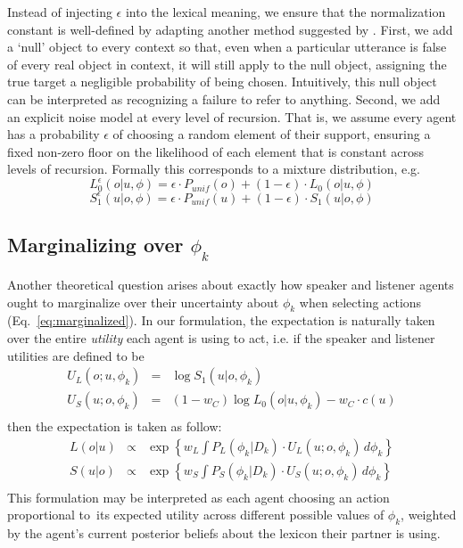 \documentclass[11pt, floatsintext]{apa6}
\begin{document}
Instead of injecting $\epsilon$ into the lexical meaning, we ensure that the normalization constant is well-defined by adapting another method suggested by .
First, we add a `null' object to every context so that, even when a particular utterance is false of every real object in context, it will still apply to the null object, assigning the true target a negligible probability of being chosen.
Intuitively, this null object can be interpreted as recognizing a failure to refer to anything.
Second, we add an explicit noise model at every level of recursion.
That is, we assume every agent has a probability $\epsilon$ of choosing a random element of their support, ensuring a fixed non-zero floor on the likelihood of each element that is constant across levels of recursion.
Formally this corresponds to a mixture distribution, e.g. 
$$L_0^{\epsilon}(o|u,\phi) = \epsilon \cdot P_{unif}(o) + (1-\epsilon) \cdot L_0(o|u,\phi)$$
$$S_1^{\epsilon}(u|o,\phi) = \epsilon \cdot P_{unif}(u) + (1-\epsilon) \cdot S_1(u|o,\phi)$$

\subsection{Marginalizing over $\phi_k$}
Another theoretical question arises about exactly how speaker and listener agents ought to marginalize over their uncertainty about $\phi_k$ when selecting actions (Eq.~\ref{eq:marginalized}). 
In our formulation, the expectation is naturally taken over the entire \emph{utility} each agent is using to act, i.e. if the speaker and listener utilities are defined to be 
$$
\begin{array}{rcl}
U_L(o;u, \phi_k) & = &  \log S_1(u|o, \phi_k)\\
U_S(u;o, \phi_k) & = &  (1-w_C)\log L_0(o|u, \phi_k) - w_C \cdot c(u) \\
\end{array}
$$
then the expectation is taken as follow:
$$
\begin{array}{rcl}
L(o|u) & \propto & \exp\left\{w_L\int P_L(\phi_k |D_k)\cdot U_L(u; o, \phi_k) \, d \phi_k\right\}\\
S(u|o) & \propto & \exp\left\{w_S\int P_S(\phi_k | D_k) \cdot U_S(u; o, \phi_k) \, d \phi_k\right\} \\
\end{array}
$$
This formulation may be interpreted as each agent choosing an action proportional to its expected utility across different possible values of $\phi_k$, weighted by the agent's current posterior beliefs about the lexicon their partner is using.
\end{document}
